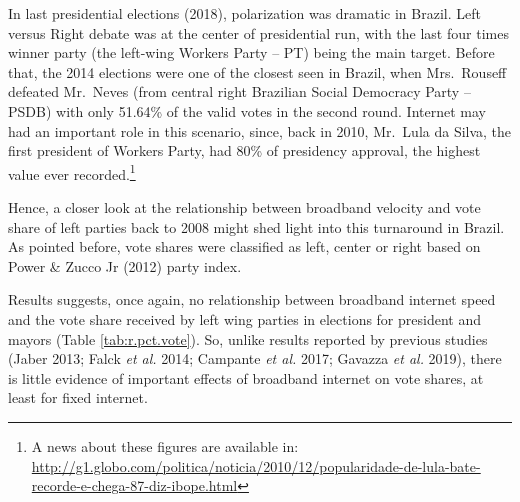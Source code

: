 \documentclass[
  12pt,
]{article}
\begin{document}
In last presidential elections (2018), polarization was dramatic in
Brazil. Left versus Right debate was at the center of presidential run,
with the last four times winner party (the left-wing Workers Party --
PT) being the main target. Before that, the 2014 elections were one of
the closest seen in Brazil, when Mrs.~Rouseff defeated Mr.~Neves (from
central right Brazilian Social Democracy Party -- PSDB) with only
51.64\% of the valid votes in the second round. Internet may had an
important role in this scenario, since, back in 2010, Mr.~Lula da Silva,
the first president of Workers Party, had 80\% of presidency approval,
the highest value ever recorded.\footnote{A news about these figures are
  available in:
  \url{http://g1.globo.com/politica/noticia/2010/12/popularidade-de-lula-bate-recorde-e-chega-87-diz-ibope.html}}

Hence, a closer look at the relationship between broadband velocity and
vote share of left parties back to 2008 might shed light into this
turnaround in Brazil. As pointed before, vote shares were classified as
left, center or right based on Power \& Zucco Jr (2012) party index.

Results suggests, once again, no relationship between broadband internet
speed and the vote share received by left wing parties in elections for
president and mayors (Table \ref{tab:r.pct.vote}). So, unlike results
reported by previous studies (Jaber 2013; Falck \emph{et al.} 2014;
Campante \emph{et al.} 2017; Gavazza \emph{et al.} 2019), there is
little evidence of important effects of broadband internet on vote
shares, at least for fixed internet.
\end{document}
